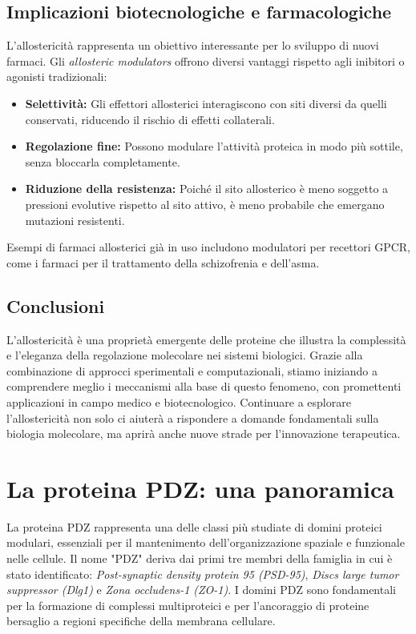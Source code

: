 \documentclass[Lau,binding=0.6cm,oneside,noexaminfo]{sapthesis}
\begin{document}
\subsection*{Implicazioni biotecnologiche e farmacologiche}
L’allostericità rappresenta un obiettivo interessante per lo sviluppo di nuovi farmaci. Gli \emph{allosteric modulators} offrono diversi vantaggi rispetto agli inibitori o agonisti tradizionali:

\begin{itemize}
    \item \textbf{Selettività:} Gli effettori allosterici interagiscono con siti diversi da quelli conservati, riducendo il rischio di effetti collaterali.
    \item \textbf{Regolazione fine:} Possono modulare l’attività proteica in modo più sottile, senza bloccarla completamente.
    \item \textbf{Riduzione della resistenza:} Poiché il sito allosterico è meno soggetto a pressioni evolutive rispetto al sito attivo, è meno probabile che emergano mutazioni resistenti.
\end{itemize}

Esempi di farmaci allosterici già in uso includono modulatori per recettori GPCR, come i farmaci per il trattamento della schizofrenia e dell’asma.

\subsection*{Conclusioni}
L’allostericità è una proprietà emergente delle proteine che illustra la complessità e l’eleganza della regolazione molecolare nei sistemi biologici. Grazie alla combinazione di approcci sperimentali e computazionali, stiamo iniziando a comprendere meglio i meccanismi alla base di questo fenomeno, con promettenti applicazioni in campo medico e biotecnologico. Continuare a esplorare l’allostericità non solo ci aiuterà a rispondere a domande fondamentali sulla biologia molecolare, ma aprirà anche nuove strade per l’innovazione terapeutica.

\section*{La proteina PDZ: una panoramica}

La proteina PDZ rappresenta una delle classi più studiate di domini proteici modulari, essenziali per il mantenimento dell’organizzazione spaziale e funzionale nelle cellule. Il nome "PDZ" deriva dai primi tre membri della famiglia in cui è stato identificato: \emph{Post-synaptic density protein 95 (PSD-95)}, \emph{Discs large tumor suppressor (Dlg1)} e \emph{Zona occludens-1 (ZO-1)}. I domini PDZ sono fondamentali per la formazione di complessi multiproteici e per l’ancoraggio di proteine bersaglio a regioni specifiche della membrana cellulare.
\end{document}
